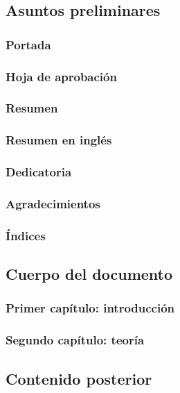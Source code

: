 \subsection{Asuntos preliminares}

\subsubsection{Portada}

\subsubsection{Hoja de aprobación}

\subsubsection{Resumen}

\subsubsection{Resumen en inglés}

\subsubsection{Dedicatoria}

\subsubsection{Agradecimientos}

\subsubsection{Índices}

\subsection{Cuerpo del documento}

\subsubsection{Primer capítulo: introducción}

\subsubsection{Segundo capítulo: teoría}

\subsection{Contenido posterior}

